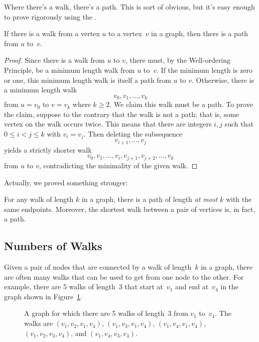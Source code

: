 Where there's a walk, there's a path.  This is sort of obvious, but
it's easy enough to prove rigorously using the .

\begin{lemma}\label{simplepath}
If there is a walk from a vertex $u$ to a vertex~$v$ in a graph, then
there is a path from $u$ to~$v$.
\end{lemma}

\begin{proof}
Since there is a walk from $u$ to $v$, there must, by the
Well-ordering Principle, be a minimum length walk from $u$ to~$v$.  If
the minimum length is zero or one, this minimum length walk is itself
a path from $u$ to $v$.  Otherwise, there is a minimum length walk
\[
v_0, v_1, \dots, v_k
\]
from $u = v_0$ to $v = v_k$ where $k \geq 2$.  We claim this walk must
be a path.  To prove the claim, suppose to the contrary that the walk
is not a path; that is, some vertex on the walk occurs twice.  This
means that there are integers $i,j$ such that $0 \leq i < j \leq k$
with $v_i= v_j$.  Then deleting the subsequence
\[
    v_{i+1}, \dots, v_j
\]
yields a strictly shorter walk
\[
    v_0, v_1,\dots, v_i,v_{j+1},v_{j+2},\dots, v_k
\]
from $u$ to $v$, contradicting the minimality of the given walk.
\end{proof}

Actually, we proved something stronger:
\begin{corollary}\label{ss}
For any walk of length $k$ in a graph, there is a path of length
\emph{at most} $k$ with the same endpoints.  Moreover, the shortest
walk between a pair of vertices is, in fact, a path.
\end{corollary}

\subsection{Numbers of Walks}

Given a pair of nodes that are connected by a walk of length~$k$ in a
graph, there are often many walks that can be used to get from one
node to the other.  For example, there are 5 walks of length~3 that
start at~$v_1$ and end at~$v_4$ in the graph shown in
Figure~\ref{fig:5AD}.

\begin{figure}


\caption{A graph for which there are 5 walks of length~3 from $v_1$
  to~$v_4$.  The walks are $(v_1, v_2, v_1, v_4)$, $(v_1, v_3, v_1,
  v_4)$, $(v_1, v_4, v_1, v_4)$, $(v_1, v_2, v_3, v_4)$, and $(v_1,
  v_4, v_3, v_4)$.}
\label{fig:5AD}
\end{figure}

